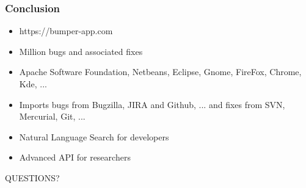 \documentclass{beamer}
\begin{document}
\begin{frame}
\frametitle{Conclusion}

\begin{itemize}
\item https://bumper-app.com
\item Million bugs and associated fixes
\item Apache Software Foundation, Netbeans, Eclipse, Gnome, FireFox, Chrome, Kde, ...
\item Imports bugs from Bugzilla, JIRA and Github, ... and fixes from SVN, Mercurial, Git, ...
\item Natural Language Search for developers
\item Advanced API for researchers
\end{itemize}



\end{frame}




\begin{frame}
\Huge{\centerline{QUESTIONS?}}
\end{frame}

\end{document}

